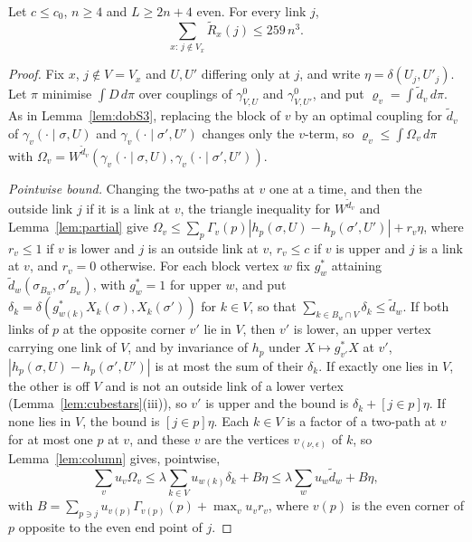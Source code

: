 \begin{proposition}\label{prop:starresponse}
Let $c\le c_0$, $n\ge4$ and $L\ge2n+4$ even. For every link $j$,
\[
\sum_{x:\,j\notin V_x}\tilde R_x(j)\le259\,n^3 .
\]
\end{proposition}

\begin{proof}
Fix $x$, $j\notin V=V_x$ and $U,U'$ differing only at $j$, and write
$\eta=\delta(U_j,U'_j)$. Let $\pi$ minimise $\int D\,d\pi$ over couplings of
$\gamma^0_{V,U}$ and $\gamma^0_{V,U'}$, and put $\varrho_v=\int\tilde d_v\,d\pi$.
As in Lemma~\ref{lem:dobS3}, replacing the block of $v$ by an optimal
coupling for $\tilde d_v$ of $\gamma_v(\cdot\mid\sigma,U)$ and
$\gamma_v(\cdot\mid\sigma',U')$ changes only the $v$-term, so $\varrho_v\le\int
\Omega_v\,d\pi$ with $\Omega_v=W^{\tilde d_v}(\gamma_v(\cdot\mid\sigma,U),
\gamma_v(\cdot\mid\sigma',U'))$.

\emph{Pointwise bound.} Changing the two-paths at $v$ one at a time, and then
the outside link $j$ if it is a link at $v$, the triangle inequality for
$W^{\tilde d_v}$ and Lemma~\ref{lem:partial} give $\Omega_v\le\sum_p\Gamma_v(p)
|h_p(\sigma,U)-h_p(\sigma',U')|+r_v\eta$, where $r_v\le1$ if $v$ is lower and
$j$ is an outside link at $v$, $r_v\le c$ if $v$ is upper and $j$ is a link at
$v$, and $r_v=0$ otherwise. For each block vertex $w$ fix $g^*_w$ attaining
$\tilde d_w(\sigma_{B_w},\sigma'_{B_w})$, with $g^*_w=1$ for upper $w$, and put
$\delta_k=\delta(g^*_{w(k)}X_k(\sigma),X_k(\sigma'))$ for $k\in V$, so that
$\sum_{k\in B_w\cap V}\delta_k\le\tilde d_w$. If both links of $p$ at the
opposite corner $v'$ lie in $V$, then $v'$ is lower, an upper vertex carrying
one link of $V$, and by invariance of $h_p$ under $X\mapsto g^*_{v'}X$ at $v'$,
$|h_p(\sigma,U)-h_p(\sigma',U')|$ is at most the sum of their $\delta_k$. If
exactly one lies in $V$, the other is off $V$ and is not an outside link of a
lower vertex (Lemma~\ref{lem:cubestars}(iii)), so $v'$ is upper and the bound
is $\delta_k+[j\in p]\eta$. If none lies in $V$, the bound is $[j\in p]\eta$.
Each $k\in V$ is a factor of a two-path at $v$ for at most one $p$ at $v$, and
these $v$ are the vertices $v_{(\nu,\epsilon)}$ of $k$, so
Lemma~\ref{lem:column} gives, pointwise,
\[
\sum_vu_v\Omega_v\le\lambda\sum_{k\in V}u_{w(k)}\delta_k+B\eta\le\lambda\sum_w
u_w\tilde d_w+B\eta,
\]
with $B=\sum_{p\ni j}u_{v(p)}\Gamma_{v(p)}(p)+\max_vu_vr_v$, where $v(p)$ is
the even corner of $p$ opposite to the even end point of $j$.


\end{proof}

